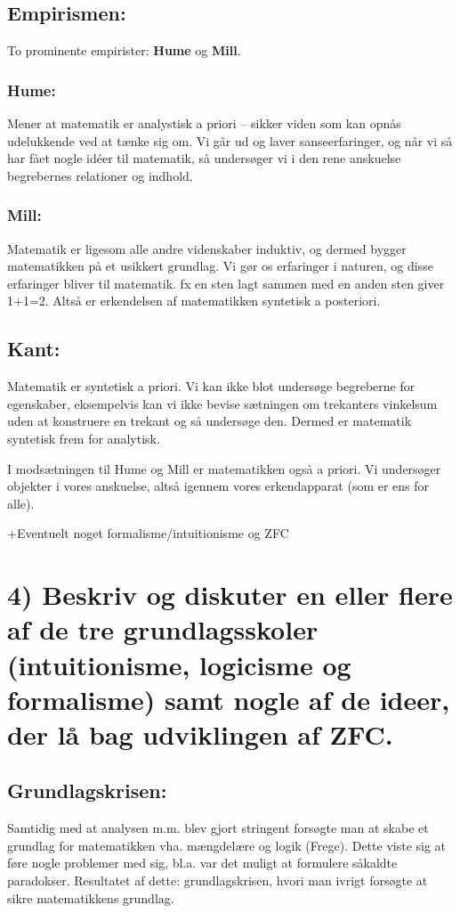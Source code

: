 \documentclass[a4paper,oneside,12pt]{memoir}
\begin{document}
\subsection{Empirismen:}

To prominente empirister: \textbf{Hume} og \textbf{Mill}.

\subsubsection{Hume:}
Mener at matematik er analystisk a priori -- sikker viden som kan opnås udelukkende ved at tænke sig om. Vi går ud og laver sanseerfaringer, og når vi så har fået nogle idéer til matematik, så undersøger vi i den rene anskuelse begrebernes relationer og indhold.
	
\subsubsection{Mill:}
Matematik er ligesom alle andre videnskaber induktiv, og dermed bygger matematikken på et usikkert grundlag. Vi gør os erfaringer i naturen, og disse erfaringer bliver til matematik. fx en sten lagt sammen med en anden sten giver 1+1=2. Altså er erkendelsen af matematikken syntetisk a posteriori.

\subsection{Kant:}

Matematik er syntetisk a priori. Vi kan ikke blot undersøge begreberne for egenskaber, eksempelvis kan vi ikke bevise sætningen om trekanters vinkelsum uden at konstruere en trekant og så undersøge den. Dermed er matematik syntetisk frem for analytisk.

I modsætningen til Hume og Mill er matematikken også a priori. Vi undersøger objekter i vores anskuelse, altså igennem vores erkendapparat (som er ens for alle).


+Eventuelt noget formalisme/intuitionisme og ZFC

\newpage
\section{4) Beskriv og diskuter en eller flere af de tre grundlagsskoler (intuitionisme, logicisme og formalisme) samt nogle af de ideer, der lå bag udviklingen af ZFC.}

\subsection{Grundlagskrisen:}
Samtidig med at analysen m.m. blev gjort stringent forsøgte man at skabe et grundlag for matematikken vha. mængdelære og logik (Frege). Dette viste sig at føre nogle problemer med sig, bl.a. var det muligt at formulere såkaldte paradokser. Resultatet af dette: grundlagskrisen, hvori man ivrigt forsøgte at sikre matematikkens grundlag.
\end{document}
